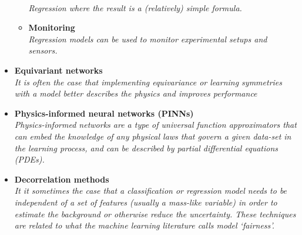 \documentclass[12pt,letterpaper]{article}
\begin{document}
\begin{itemize}
\begin{itemize}
		\\\textit{Regression where the result is a (relatively) simple formula.}
		\item \textbf{Monitoring}~\cite{Gavrikov:2025tzc,Brinkerhoff:2025rob,AbdusSalam:2024obf,Li:2024akn,Cushman:2024jgi,Shutt:2024che,CMSECAL:2023fvz,Das:2023ktd,Harilal:2023smf,Chen:2023cim,Joshi:2023btt,CMSMuon:2023czf,Matha:2023tmf,Mukund:2023oyy}
		\\\textit{Regression models can be used to monitor experimental setups and sensors.}
	\end{itemize}
\item \textbf{Equivariant networks}~\cite{Sanz:2025sld,Nabat:2024nce,Woodward:2024dxb,Brehmer:2024yqw,Maitre:2024hzp,Hendi:2024yin,Cruz:2024grk,Spinner:2024hjm,Bhardwaj:2024wrf,Sahu:2024sts,Bhardwaj:2024djv,Chatterjee:2024pbp,Bressler:2024wzc,Gu:2024lrz,Bright-Thonney:2023gdl,Bogatskiy:2023nnw,Murnane:2023kfm,Lehner:2023prf,Forestano:2023qcy,Buhmann:2023pmh,Aronsson:2023rli,Forestano:2023fpj,Lehner:2023bba,Hao:2022zns,Bogatskiy:2022czk,Favoni:2022mcg,Bogatskiy:2022hub,Shi:2022yqw,Gong:2022lye,Bulusu:2021njs,Favoni:2020reg,Dolan:2020qkr,Kanwar:2003.06413}
\\\textit{It is often the case that implementing equivariance or learning symmetries with a model better describes the physics and improves performance}
\item \textbf{Physics-informed neural networks (PINNs)}~\cite{Bento:2025agw,Hashimoto:2024mdi,Terin:2024iyy,Vatellis:2024vjl,Panahi:2024sfb}
\\\textit{Physics-informed networks are a type of universal function approximators that can embed the knowledge of any physical laws that govern a given data-set in the learning process, and can be described by partial differential equations (PDEs).}
\item \textbf{Decorrelation methods}~\cite{Rothen:2024vro,Algren:2023spv,Rabusov:2022woa,Das:2022cjl,Klein:2022hdv,Mikuni:2021nwn,Dolan:2021pml,Ghosh:2021hrh,Kitouni:2020xgb,Kasieczka:2020pil,clavijo2020adversarial,10.1088/2632-2153/ab9023,Rogozhnikov:2014zea,Wunsch:2019qbo,Englert:2018cfo,Xia:2018kgd,DiscoFever,ATL-PHYS-PUB-2018-014,Bradshaw:2019ipy,Shimmin:2017mfk,Stevens:2013dya,Moult:2017okx,Dolen:2016kst,Louppe:2016ylz}
\\\textit{It it sometimes the case that a classification or regression model needs to be independent of a set of features (usually a mass-like variable) in order to estimate the background or otherwise reduce the uncertainty.  These techniques are related to what the machine learning literature calls model `fairness'.}

\end{itemize}
\end{document}
